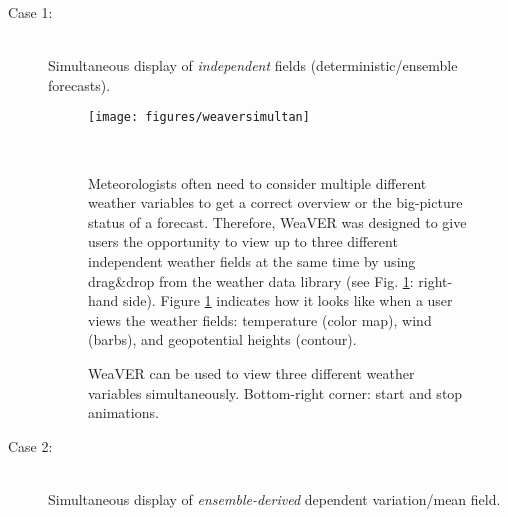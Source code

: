 \documentclass[citeauthoryear]{llncs}
\begin{document}
\begin{description}
	\item[Case 1:] \ \\
	Simultaneous display of \textit{independent} fields (deterministic/ensemble forecasts).\\
	\begin{figure}[h!]
		\vspace*{-0.9cm}
		\begin{minipage}[t]{7.4cm}
			\vspace{0pt}
			\centering
			\texttt{[image: figures/weaversimultan]}
			\caption{WeaVER can be used to view three different weather variables simultaneously. Bottom-right corner: start and stop animations.}
			\label{weaversim}
		\end{minipage}
		~
		\begin{minipage}[t]{4.6cm}
			\vspace{0pt}
			Meteorologists often need to consider multiple different weather variables to get a correct overview or the big-picture status of a forecast. Therefore, WeaVER was designed to give users the opportunity to view up to three different independent weather fields at the same time by using drag\&drop from the weather data library (see Fig. \ref{weaversim}: right-hand side). Figure \ref{weaversim} indicates how it looks like when a user views the weather fields: temperature (color map), wind (barbs), and geopotential heights (contour).
		\end{minipage}
		\vspace*{-0.5cm}
	\end{figure}	
	\item[Case 2:] \ \\
	Simultaneous display of \textit{ensemble-derived} dependent variation/mean field.\\
	

\end{description}
\end{document}
